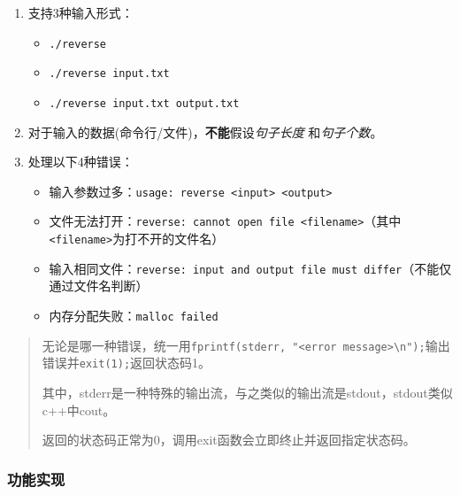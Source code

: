 \documentclass{article}
\begin{document}
\begin{enumerate}
  \def\labelenumi{\arabic{enumi}.}
  \item
        支持3种输入形式：

        \begin{itemize}
          \item
                \texttt{./reverse}
          \item
                \texttt{./reverse\ input.txt}
          \item
                \texttt{./reverse\ input.txt\ output.txt}
        \end{itemize}
  \item
        对于输入的数据(命令行/文件)，\textbf{不能}假设\emph{句子长度}
        和\emph{句子个数}。
  \item
        处理以下4种错误：

        \begin{itemize}
          \item
                输入参数过多：\texttt{usage:\ reverse\ \textless{}input\textgreater{}\ \textless{}output\textgreater{}}
          \item
                文件无法打开：\texttt{reverse:\ cannot\ open\ file\ \textquotesingle{}\textless{}filename\textgreater{}\textquotesingle{}}（其中\texttt{\textless{}filename\textgreater{}}为打不开的文件名）
          \item
                输入相同文件：\texttt{reverse:\ input\ and\ output\ file\ must\ differ}（不能仅通过文件名判断）
          \item
                内存分配失败：\texttt{malloc\ failed}
        \end{itemize}
\end{enumerate}

\begin{quote}
  无论是哪一种错误，统一用\texttt{fprintf(stderr,\ "\textless{}error\ message\textgreater{}\textbackslash{}n");}输出错误并\texttt{exit(1);}返回状态码1。

  其中，stderr是一种特殊的输出流，与之类似的输出流是stdout，stdout类似c++中cout。

  返回的状态码正常为0，调用exit函数会立即终止并返回指定状态码。
\end{quote}

\subsubsection{功能实现}\label{ux529fux80fdux5b9eux73b0}
\end{document}
